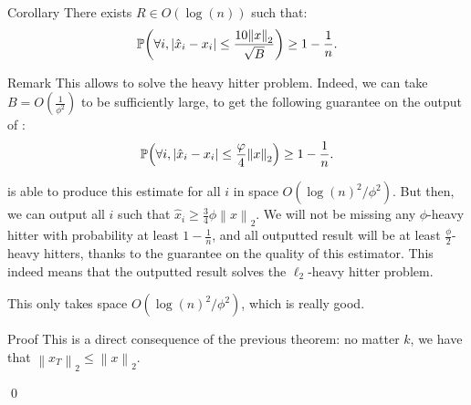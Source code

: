 \documentclass[a4paper]{article}
\begin{document}
\begin{parag}{Corollary}
    There exists $R \in O\left(\log\left(n\right)\right)$ such that:
    \[\prob\left(\forall i, \left|\hat{x}_i - x_i\right| \leq \frac{10\left\|x\right\|_2}{\sqrt{B}}\right) \geq 1 - \frac{1}{n}.\]
    
    \begin{subparag}{Remark}
        This allows  to solve the heavy hitter problem. Indeed, we can take $B = O\left(\frac{1}{\phi^2}\right)$ to be sufficiently large, to get the following guarantee on the output of : 
        \[\prob\left(\forall i, \left|\hat{x}_i - x_i\right| \leq \frac{\phi}{4} \left\|x\right\|_2\right) \geq 1 - \frac{1}{n}.\]
        
         is able to produce this estimate for all $i$ in space $O\left(\log\left(n\right)^2 / \phi^2\right)$. But then, we can output all $i$ such that $\hat{x}_i \geq \frac{3}{4} \phi \left\|x\right\|_2$. We will not be missing any $\phi$-heavy hitter with probability at least $1 - \frac{1}{n}$, and all outputted result will be at least $\frac{\phi}{2}$-heavy hitters, thanks to the guarantee on the quality of this estimator. This indeed means that the outputted result solves the $\ell_2$-heavy hitter problem.

        This only takes space $O\left(\log\left(n\right)^2 / \phi^2\right)$, which is really good.
    \end{subparag}

    \begin{subparag}{Proof}
        This is a direct consequence of the previous theorem: no matter $k$, we have that $\left\|x_T\right\|_2 \leq \left\|x\right\|_2$.

        \qed
    \end{subparag}
\end{parag}
\end{document}
